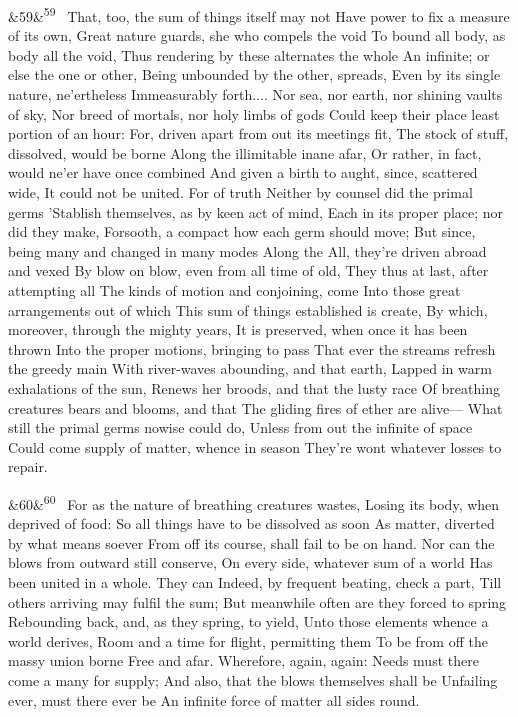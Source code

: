 \documentclass[12pt]{article}
\newcommand{\para}[1][]{\par\noindent\ifx&#1&\else\textsuperscript{\footnotesize #1}~\fi}
\begin{document}
\para[59] That, too, the sum of things itself may not Have power to fix a measure of its own, Great nature guards, she who compels the void To bound all body, as body all the void, Thus rendering by these alternates the whole An infinite; or else the one or other, Being unbounded by the other, spreads, Even by its single nature, ne'ertheless Immeasurably forth.... Nor sea, nor earth, nor shining vaults of sky, Nor breed of mortals, nor holy limbs of gods Could keep their place least portion of an hour: For, driven apart from out its meetings fit, The stock of stuff, dissolved, would be borne Along the illimitable inane afar, Or rather, in fact, would ne'er have once combined And given a birth to aught, since, scattered wide, It could not be united. For of truth Neither by counsel did the primal germs 'Stablish themselves, as by keen act of mind, Each in its proper place; nor did they make, Forsooth, a compact how each germ should move; But since, being many and changed in many modes Along the All, they're driven abroad and vexed By blow on blow, even from all time of old, They thus at last, after attempting all The kinds of motion and conjoining, come Into those great arrangements out of which This sum of things established is create, By which, moreover, through the mighty years, It is preserved, when once it has been thrown Into the proper motions, bringing to pass That ever the streams refresh the greedy main With river-waves abounding, and that earth, Lapped in warm exhalations of the sun, Renews her broods, and that the lusty race Of breathing creatures bears and blooms, and that The gliding fires of ether are alive--- What still the primal germs nowise could do, Unless from out the infinite of space Could come supply of matter, whence in season They're wont whatever losses to repair.

\para[60] For as the nature of breathing creatures wastes, Losing its body, when deprived of food: So all things have to be dissolved as soon As matter, diverted by what means soever From off its course, shall fail to be on hand. Nor can the blows from outward still conserve, On every side, whatever sum of a world Has been united in a whole. They can Indeed, by frequent beating, check a part, Till others arriving may fulfil the sum; But meanwhile often are they forced to spring Rebounding back, and, as they spring, to yield, Unto those elements whence a world derives, Room and a time for flight, permitting them To be from off the massy union borne Free and afar. Wherefore, again, again: Needs must there come a many for supply; And also, that the blows themselves shall be Unfailing ever, must there ever be An infinite force of matter all sides round.
\end{document}
